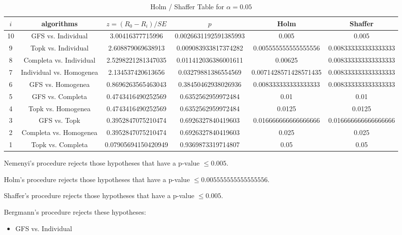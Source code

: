 \documentclass[a4paper,10pt]{article}
\begin{document}
\begin{landscape}
\begin{table}[!htp]
\centering\tiny
\caption{Holm / Shaffer Table for $\alpha=0.05$}
\begin{tabular}{cccccc}
$i$&algorithms&$z=(R_0 - R_i)/SE$&$p$&Holm&Shaffer\\
\hline
10&GFS vs. Individual&3.00416377715996&0.0026631192591385993&0.005&0.005\\
9&Topk vs. Individual&2.608879069638913&0.009083933817374282&0.005555555555555556&0.008333333333333333\\
8&Completa vs. Individual&2.5298221281347035&0.011412036386001611&0.00625&0.008333333333333333\\
7&Individual vs. Homogenea&2.134537420613656&0.03279881386554569&0.0071428571428571435&0.008333333333333333\\
6&GFS vs. Homogenea&0.8696263565463043&0.38450462938026936&0.008333333333333333&0.008333333333333333\\
5&GFS vs. Completa&0.4743416490252569&0.6352562959972484&0.01&0.01\\
4&Topk vs. Homogenea&0.4743416490252569&0.6352562959972484&0.0125&0.0125\\
3&GFS vs. Topk&0.3952847075210474&0.6926327840419603&0.016666666666666666&0.016666666666666666\\
2&Completa vs. Homogenea&0.3952847075210474&0.6926327840419603&0.025&0.025\\
1&Topk vs. Completa&0.07905694150420949&0.9369873319714807&0.05&0.05\\
\hline
\end{tabular}
\end{table}
Nemenyi's procedure rejects those hypotheses that have a p-value $\le0.005$.


Holm's procedure rejects those hypotheses that have a p-value $\le0.005555555555555556$.


Shaffer's procedure rejects those hypotheses that have a p-value $\le0.005$.


Bergmann's procedure rejects these hypotheses:


\begin{itemize}


\item GFS vs. Individual
\end{itemize}



\end{landscape}
\end{document}
